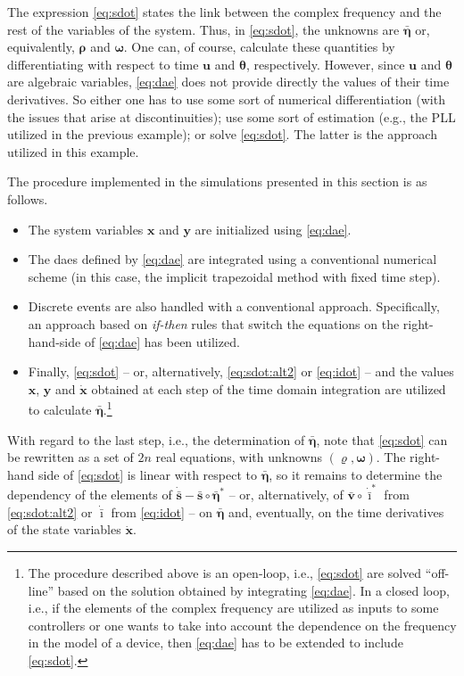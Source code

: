 \documentclass[journal, twocolumn, letter]{IEEEtran}
\newcommand{\bfg}[1]{\boldsymbol{#1}}
\newcommand{\bfp}[1]{\bar{\boldsymbol{#1}}}
\newcommand{\ii}{\imath}
\newcommand{\xdot}{\dot{\bfg x}}
\newcommand{\idot}{\dot{\bar{\bfg \ii}}}
\newcommand{\vvec}{\bfp v}
\newcommand{\svec}{\bar{\bfg s}}
\newcommand{\sdot}{\dot{\bar{\bfg s}}}
\newcommand{\evec}{\bar{\bfg \eta}}
\newcommand{\rhovec}{\bfg \varrho}
\newcommand{\wvec}{\bfg \omega}
\begin{document}
The expression \eqref{eq:sdot} states the link between the complex
frequency and the rest of the variables of the system.  Thus, in
\eqref{eq:sdot}, the unknowns are $\bar{\bfg \eta}$ or, equivalently,
$\bfg \rho$ and $\bfg \omega$.
One can, of course, calculate these quantities by differentiating with
respect to time $\bfg u$ and $\bfg \theta$, respectively.  However,
since $\bfg u$ and $\bfg \theta$ are algebraic variables,
\eqref{eq:dae} does not provide directly the values of their time
derivatives.  So either one has to use some sort of numerical
differentiation (with the issues that arise at discontinuities); use
some sort of estimation (e.g., the PLL utilized in the previous
example); or solve \eqref{eq:sdot}.  The latter is the approach
utilized in this example.

The procedure implemented in the simulations presented in this section
is as follows.
\begin{itemize}
\item The system variables $\bfg x$ and $\bfg y$ are initialized using
  \eqref{eq:dae}.
\item The \acp{dae} defined by \eqref{eq:dae} are integrated using a
  conventional numerical scheme (in this case, the implicit
  trapezoidal method with fixed time step).
\item Discrete events are also handled with a conventional approach.
  Specifically, an approach based on \textit{if-then} rules that
  switch the equations on the right-hand-side of \eqref{eq:dae} has
  been utilized.
\item Finally, \eqref{eq:sdot} -- or, alternatively,
  \eqref{eq:sdot:alt2} or \eqref{eq:idot} -- and the values $\bfg x$,
  $\bfg y$ and $\dot{\bfg x}$ obtained at each step of the time domain
  integration are utilized to calculate $\evec$.\footnote{ The
    procedure described above is an open-loop, i.e., \eqref{eq:sdot}
    are solved ``off-line'' based on the solution obtained by
    integrating \eqref{eq:dae}.  In a closed loop, i.e., if the
    elements of the complex frequency are utilized as inputs to some
    controllers or one wants to take into account the dependence on
    the frequency in the model of a device, then \eqref{eq:dae} has to
    be extended to include \eqref{eq:sdot}.}
\end{itemize}
With regard to the last step, i.e., the determination of $\evec$, note
that \eqref{eq:sdot} can be rewritten as a set of $2n$ real equations,
with unknowns $(\rhovec, \wvec)$.  The right-hand side of
\eqref{eq:sdot} is linear with respect to $\evec$, so it remains to
determine the dependency of the elements of
$\sdot - \svec \circ \evec^*$ -- or, alternatively, of
$\vvec \circ \idot^*$ from \eqref{eq:sdot:alt2} or $\idot$ from
\eqref{eq:idot} -- on $\evec$ and, eventually, on the time derivatives
of the state variables $\xdot$.
\end{document}
